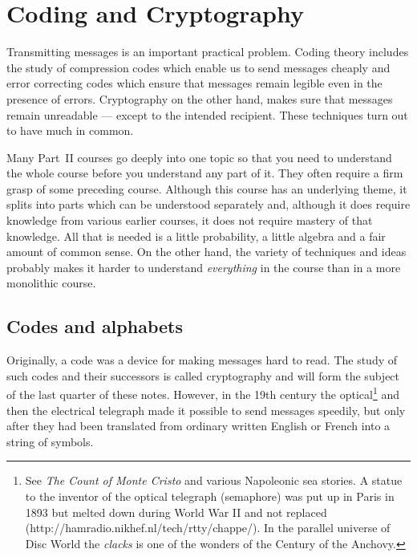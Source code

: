 \chapter{Coding and Cryptography}

Transmitting messages is an important practical problem. Coding theory includes the study of compression codes which enable us to send messages cheaply and error correcting codes which ensure that messages remain legible even in the presence of errors. Cryptography on the other hand, makes sure that messages remain unreadable --- except to the intended recipient. These techniques turn out to have much in common.

Many Part~II courses go deeply into one topic so that you need to understand the whole course before you understand any part of it. They often require a firm grasp of some preceding course. Although this course has an underlying theme, it splits into parts which can be understood separately and, although it does require knowledge from various earlier courses, it does not require mastery of that knowledge. All that is needed is a little probability, a little algebra and a fair amount of common sense. On the other hand, the variety of techniques and ideas probably makes it harder to understand \emph{everything} in the course than in a more monolithic course.



\section{Codes and alphabets}\label{S;alphabets}
Originally, a code was a device for making messages
hard to read. The study of such codes and their
successors is called cryptography and will form
the subject of the last quarter of these notes.
However, in the 19th century the
optical\footnote{See \emph{The Count of Monte Cristo}
and various Napoleonic sea stories.
A statue to the inventor of the optical telegraph
(semaphore)
was put up in Paris in 1893 but melted down during
World War II and not replaced 
(http://hamradio.nikhef.nl/tech/rtty/chappe/).
In the parallel universe of Disc World the 
\emph{clacks} is one of the wonders of the
Century of the Anchovy.} and
then the electrical telegraph made it
possible to send messages speedily, but
only after they had been translated from ordinary written
English or French into a string of symbols.

